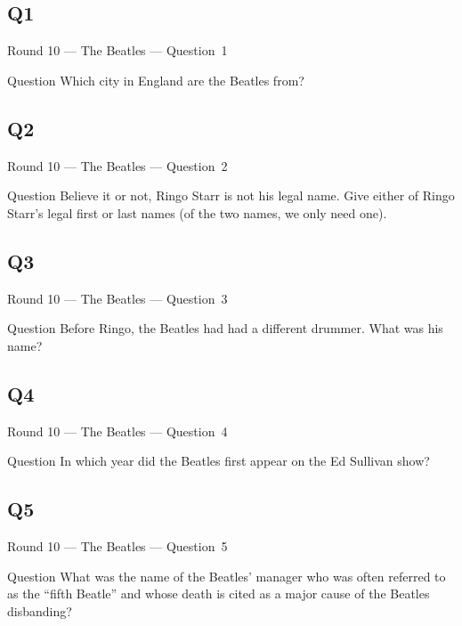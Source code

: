 \documentclass[11pt]{beamer}
\begin{document}
\subsection*{Q1}
\begin{frame}[t]{Round 10 --- The Beatles --- \mbox{Question 1}}
\vspace{-0.5em}
\begin{block}{Question}
Which city in England are the Beatles from?
\end{block}
\end{frame}
\subsection*{Q2}
\begin{frame}[t]{Round 10 --- The Beatles --- \mbox{Question 2}}
\vspace{-0.5em}
\begin{block}{Question}
Believe it or not, Ringo Starr is not his legal name. Give either of Ringo Starr's legal first or last names (of the two names, we only need one).
\end{block}
\end{frame}
\subsection*{Q3}
\begin{frame}[t]{Round 10 --- The Beatles --- \mbox{Question 3}}
\vspace{-0.5em}
\begin{block}{Question}
Before Ringo, the Beatles had had a different drummer. What was his name?
\end{block}
\end{frame}
\subsection*{Q4}
\begin{frame}[t]{Round 10 --- The Beatles --- \mbox{Question 4}}
\vspace{-0.5em}
\begin{block}{Question}
In which year did the Beatles first appear on the Ed Sullivan show?
\end{block}
\end{frame}
\subsection*{Q5}
\begin{frame}[t]{Round 10 --- The Beatles --- \mbox{Question 5}}
\vspace{-0.5em}
\begin{block}{Question}
What was the name of the Beatles' manager who was often referred to as the ``fifth Beatle'' and whose death is cited as a major cause of the Beatles disbanding?
\end{block}
\end{frame}
\end{document}
